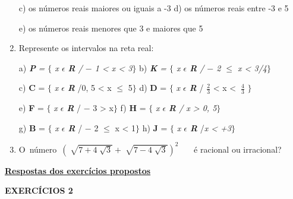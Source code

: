 \documentclass[12pt]{article}
\renewcommand{\_}{\kern-1.5pt\textunderscore\kern-1.5pt}
\begin{document}
\begin{enumerate}[label*={\fontsize{12pt}{12pt}\selectfont \arabic*.}]
\tab c) os números reais maiores ou iguais a -3 \tab d) os números reais entre -3 e 5\par

\tab e) os números reais menores que 3 e maiores que 5\par

	\item  Represente os intervalos na reta real:\par

\tab a) \textbf{\textit{P}}\textit{ = $ \{ $ x $ \epsilon $  \textbf{R }/ $-$  1 < x < 3$ \} $ } \tab \tab b) \textbf{\textit{K}}\textit{ = $ \{ $  x $ \epsilon $  \textbf{R }/ $-$  2 $ \leq $   x < 3/4$ \} $ }\par

\tab c) \textbf{C} = $ \{ $ \textit{ x $ \epsilon $  \textbf{R }}/0, 5 < x \textit{$ \leq $ } 5$ \} $  \tab \tab d) \textbf{D} = $ \{ $ \textit{ x $ \epsilon $  \textbf{R }}/  \( \frac{2}{3} \)  < x < \( ~\frac{4}{3} \) $ \} $ \par

\tab e) \textbf{F} = $ \{ $ \textit{x $ \epsilon $  \textbf{R }}/ $-$  3 > x$ \} $  \tab \tab f) \textbf{H} = $ \{ $ \textit{ x $ \epsilon $  \textbf{R }/ x > 0, 5}$ \} $ \par

\tab g) \textbf{B }= $ \{ $ \textit{ x $ \epsilon $  \textbf{R }}/ $-$  2 $ \leq $   x < 1$ \} $  \tab \tab h)\textbf{ J} = $ \{ $ \textit{ x $ \epsilon $  \textbf{R }}/\textit{x < +3}$ \} $ \par

	\item  O\ número\    \(  \left( \sqrt[]{7+4\sqrt[]{3}}+\sqrt[]{7-4\sqrt[]{3}} \right) ^{2} \) \ \ \  é racional ou irracional?
\end{enumerate}\par


\vspace{\baselineskip}
\setlength{\parskip}{8.04pt}
\textbf{\uline{Respostas dos exercícios propostos }}\par

\begin{adjustwidth}{0.3in}{0.0in}
\textbf{EXERCÍCIOS 2}\par

\end{adjustwidth}
\end{document}
